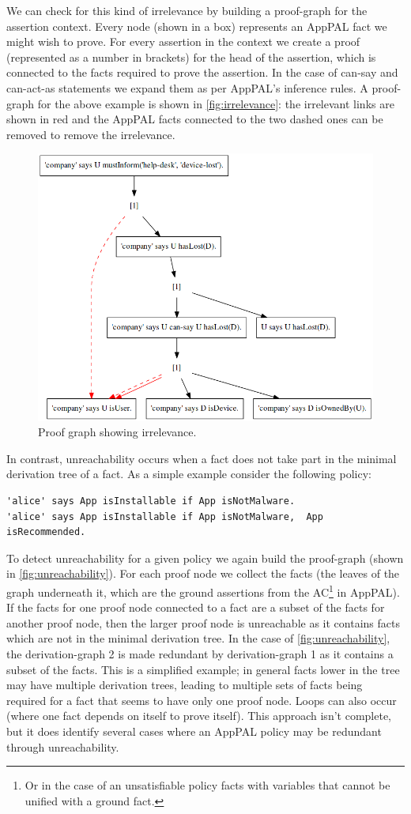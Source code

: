 \documentclass[thesis.tex]{subfiles}
\begin{document}
We can check for this kind of irrelevance by building a proof-graph for the
assertion context.  Every node (shown in a box) represents an AppPAL fact we
might wish to prove.  For every assertion in the context we create a proof
(represented as a number in brackets) for the head of the assertion, which is
connected to the facts required to prove the assertion.  In the case of can-say
and can-act-as statements we expand them as per AppPAL's inference rules.
A proof-graph for the above example is shown in \autoref{fig:irrelevance}: the
irrelevant links are shown in red and the AppPAL facts connected to the two
dashed ones can be removed to remove the irrelevance.

\begin{figure}
  \centering
  \includegraphics[width=0.5\linewidth]{./figures/irrelevance.png}
  \caption{Proof graph showing irrelevance.}
  \label{fig:irrelevance}
\end{figure}

In contrast, unreachability occurs when a fact does not take part in the minimal
derivation tree of a fact.  As a simple example consider the following policy:

\begin{lstlisting}
'alice' says App isInstallable if App isNotMalware.
'alice' says App isInstallable if App isNotMalware,  App isRecommended.
\end{lstlisting}

To detect unreachability for a given policy we again build the proof-graph (shown
in \autoref{fig:unreachability}).  For each proof node we collect the facts
(the leaves of the graph underneath it, which are the ground assertions from the
AC\footnote{Or in the case of an unsatisfiable policy facts with variables that
  cannot be unified with a ground fact.} in
AppPAL).  If the facts for one proof node connected to a fact are a subset of
the facts for another proof node, then the larger proof node is unreachable as it
contains facts which are not in the minimal derivation tree.   In the case of
\autoref{fig:unreachability}, the derivation-graph 2 is made redundant by
derivation-graph 1 as it contains a subset of the facts.  This is a
simplified example; in general facts lower in the tree may have multiple
derivation trees, leading to multiple sets of facts being required for a fact
that seems to have only one proof node.  Loops can also occur (where one fact
depends on itself to prove itself).  This approach isn't complete, but it does
identify several cases where an AppPAL policy may be redundant through
unreachability.
\end{document}
